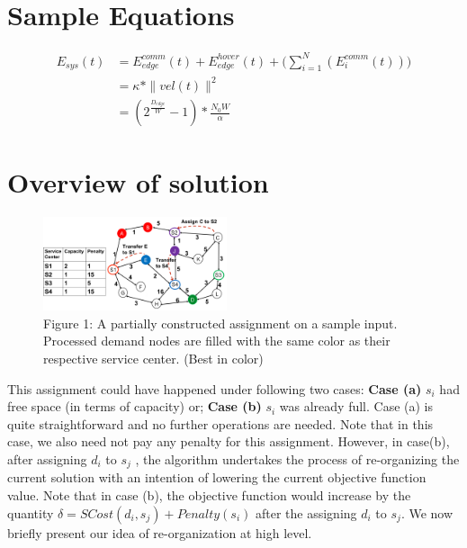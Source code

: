 \documentclass{article}
\begin{document}
    


\section{Sample Equations}


\begin{align*}
E_{sys} (t) &= E^{comm}_{edge} (t) + E^{hover}_{edge} (t) + \Bigg( \sum_{i=1}^{N} ( E_{i}^{comm} (t) ) \Bigg) \\
&= \kappa * \|{vel (t)}\|^2
\\
&= ( 2^{\frac{D_{edge}}{W}} - 1) * \frac{N_0 W}{\alpha}
\tag{2}
\end{align*}




\section{Overview of solution}

\begin{figure}
  \begin{center}
    \includegraphics[width=0.48\textwidth]{run_eg_one.png}
  \end{center}
  \caption{Figure 1: A partially constructed assignment on a sample input. Processed demand nodes are filled with the same color as their respective service center. (Best in color)}
\end{figure}


This assignment could have happened under following two cases: \textbf{Case (a)} $s_i$ had free space (in terms of capacity) or; \textbf{Case (b)} $s_i$ was already full. Case (a) is quite straightforward and no further operations are needed. Note that in this case, we also need not pay any penalty for this assignment. However, in case(b), after assigning $d_i$ to $s_j$ , the algorithm undertakes the process of re-organizing the current solution with an intention of lowering the current objective function value. Note that in case (b), the objective function would increase by the quantity $\delta = SCost(d_i, s_j ) + Penalty(s_i)$ after the assigning $d_i$ to $s_j$. We now briefly present our idea of re-organization at high level.
\end{document}
